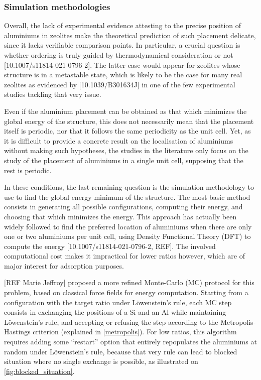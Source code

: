 \documentclass[main.tex]{subfiles}
\begin{document}
\subsubsection{Simulation methodologies}

Overall, the lack of experimental evidence attesting to the precise position of aluminiums in zeolites make the theoretical prediction of such placement delicate, since it lacks verifiable comparison points. In particular, a crucial question is whether \SiAl ordering is truly guided by thermodynamical consideration or not [10.1007/s11814-021-0796-2]. The latter case would appear for zeolites whose structure is in a metastable state, which is likely to be the case for many real zeolites as evidenced by [10.1039/B301634J] in one of the few experimental studies tackling that very issue.

Even if the aluminium placement can be obtained as that which minimizes the global energy of the structure, this does not necessarily mean that the placement itself is periodic, nor that it follows the same periodicity as the unit cell. Yet, as it is difficult to provide a concrete result on the localisation of aluminiums without making such hypotheses, the studies in the literature only focus on the study of the placement of aluminiums in a single unit cell, supposing that the rest is periodic.

In these conditions, the last remaining question is the simulation methodology to use to find the global energy minimum of the structure. The most basic method consists in generating all possible configurations, computing their energy, and choosing that which minimizes the energy. This approach has actually been widely followed to find the preferred location of aluminiums when there are only one or two aluminiums per unit cell, using Density Functional Theory (DFT) to compute the energy [10.1007/s11814-021-0796-2, REF]. The involved computational cost makes it impractical for lower \SiAl ratios however, which are of major interest for adsorption purposes.

[REF Marie Jeffroy]\label{mariejeffroy_al} proposed a more refined Monte-Carlo (MC) protocol for this problem, based on classical force fields for energy computation. Starting from a configuration with the target \SiAl ratio under L\"owenstein's rule, each MC step consists in exchanging the positions of a Si and an Al while maintaining L\"owenstein's rule, and accepting or refusing the step according to the Metropolis-Hastings criterion (explained in \cref{metropolis}). For low \SiAl ratios, this algorithm requires adding some ``restart'' option that entirely repopulates the aluminiums at random under L\"owenstein's rule, because that very rule can lead to blocked situation where no single \SiAl exchange is possible, as illustrated on \cref{fig:blocked_situation}.
\end{document}
